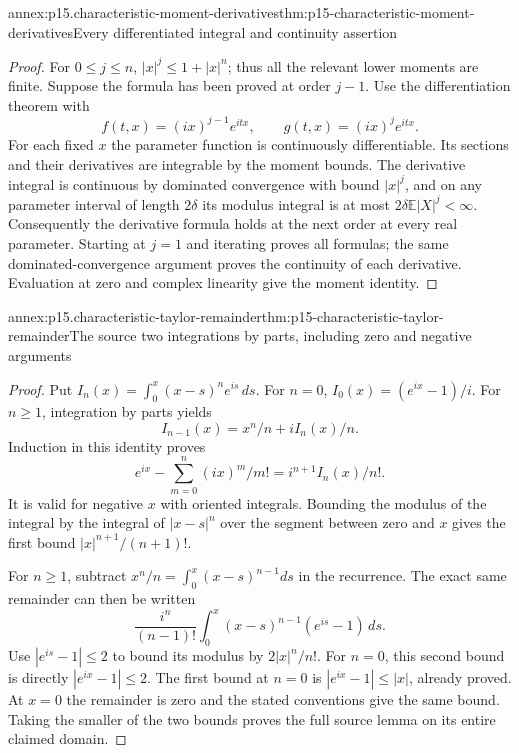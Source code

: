 \begin{annexitem}{annex:p15.characteristic-moment-derivatives}{thm:p15-characteristic-moment-derivatives}{Every differentiated integral and continuity assertion}
\begin{proof}
For \(0\leq j\leq n\), \(|x|^j\leq1+|x|^n\);
thus all the relevant lower moments are finite.
Suppose the formula has been proved at order \(j-1\).
Use the differentiation theorem with
\[
 f(t,x)=(ix)^{j-1}e^{itx},\qquad
 g(t,x)=(ix)^j e^{itx}.
\]
For each fixed \(x\) the parameter function is
continuously differentiable. Its sections and their
derivatives are integrable by the moment bounds.
The derivative integral is continuous by dominated
convergence with bound \(|x|^j\), and on any parameter
interval of length \(2\delta\) its modulus integral
is at most \(2\delta\mathbb E|X|^j<\infty\).
Consequently the derivative formula holds at the
next order at every real parameter.
Starting at \(j=1\) and iterating proves all formulas;
the same dominated-convergence argument proves the
continuity of each derivative. Evaluation at zero
and complex linearity give the moment identity.
\end{proof}
\end{annexitem}

\begin{annexitem}{annex:p15.characteristic-taylor-remainder}{thm:p15-characteristic-taylor-remainder}{The source two integrations by parts, including zero and negative arguments}
\begin{proof}
Put \(I_n(x)=\int_0^x(x-s)^n e^{is}\,ds\).
For \(n=0\), \(I_0(x)=(e^{ix}-1)/i\).
For \(n\geq1\), integration by parts yields
\[
 I_{n-1}(x)=x^n/n+iI_n(x)/n.
\]
Induction in this identity proves
\[
 e^{ix}-\sum_{m=0}^n(ix)^m/m!
                         =i^{n+1}I_n(x)/n!.
\]
It is valid for negative \(x\) with oriented integrals.
Bounding the modulus of the integral by the integral
of \(|x-s|^n\) over the segment between zero and \(x\)
gives the first bound \(|x|^{n+1}/(n+1)!\).

For \(n\geq1\), subtract
\(x^n/n=\int_0^x(x-s)^{n-1}ds\) in the recurrence.
The exact same remainder can then be written
\[
 \frac{i^n}{(n-1)!}
       \int_0^x(x-s)^{n-1}(e^{is}-1)\,ds.
\]
Use \(|e^{is}-1|\leq2\) to bound its modulus by
\(2|x|^n/n!\).
For \(n=0\), this second bound is directly
\(|e^{ix}-1|\leq2\).
The first bound at \(n=0\) is \(|e^{ix}-1|\leq|x|\),
already proved. At \(x=0\) the remainder is zero
and the stated conventions give the same bound.
Taking the smaller of the two bounds proves the
full source lemma on its entire claimed domain.
\end{proof}
\end{annexitem}


